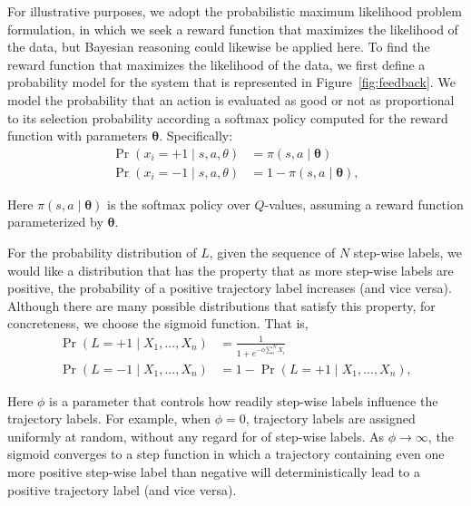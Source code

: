 For illustrative purposes, we adopt the probabilistic maximum
likelihood problem formulation, in which we seek a reward function
that maximizes the likelihood of the data, but Bayesian reasoning
could likewise be applied here.
%
To find the reward function that maximizes the likelihood of the data,
we first define a probability model for the system that is represented
in Figure~\ref{fig:feedback}.
%
We model the probability that an action is evaluated as good or not as
proportional to its selection probability according a softmax policy
computed for the reward function with parameters
$\bm{\theta}$. Specifically:
%
\begin{align}
\Pr(x_i = +1 \mid s, a, \theta) &= \pi(s, a \mid \bm{\theta}) \\
\Pr(x_i = -1 \mid s, a, \theta) &= 1 - \pi(s, a \mid \bm{\theta}),
\end{align}

\noindent
Here $\pi(s, a \mid \bm{\theta})$ is the softmax policy over $Q$-values,
assuming a reward function parameterized by $\bm{\theta}$.


For the probability distribution of $L$, given the sequence of $N$
step-wise labels, we would like a distribution that has the property
that as more step-wise labels are positive, the probability of a
positive trajectory label increases (and vice versa). Although there
are many possible distributions that satisfy this property, for
concreteness, we choose the sigmoid function. That is,
%
\begin{align}
\Pr(L = +1 \mid X_1, ..., X_n) &= \frac{1}{1 + e^{-\phi \sum_i^N X_i}} \\
\Pr(L = -1 \mid X_1, ... ,X_n) &= 1 - \Pr(L = +1 \mid X_1, ..., X_n),
\end{align}

\noindent
Here $\phi$ is a parameter that controls how readily step-wise labels
influence the trajectory labels.  For example, when $\phi = 0$,
trajectory labels are assigned uniformly at random, without any regard
for of step-wise labels.  As $\phi \rightarrow \infty$, the sigmoid
converges to a step function in which a trajectory containing even one
more positive step-wise label than negative will deterministically
lead to a positive trajectory label (and vice versa).

